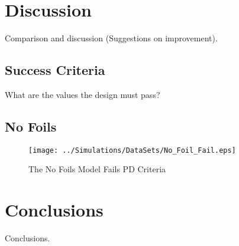 
\section{Discussion}
Comparison and discussion (Suggestions on improvement).

\subsection{Success Criteria}
What are the values the design must pass?

\subsection{No Foils}
\begin{figure}[!h]
  \centering
    \texttt{[image: ../Simulations/DataSets/No\_Foil\_Fail.eps]} 
\caption{The No Foils Model Fails PD Criteria}
\label{Figure:NoFoilsFail}
\end{figure}

\section{Conclusions}
Conclusions.

